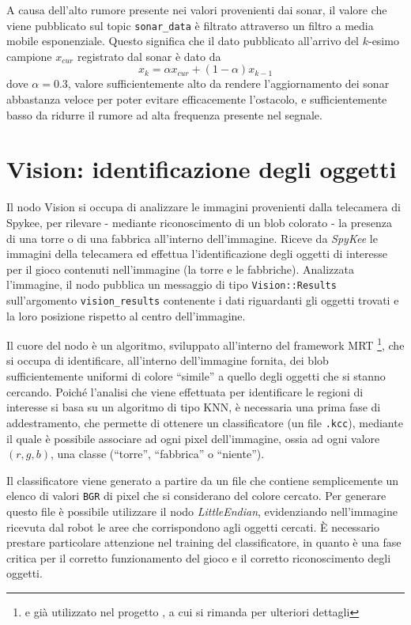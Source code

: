 A causa dell'alto rumore presente nei valori provenienti dai sonar, il valore che viene pubblicato sul topic \verb|sonar_data| è filtrato attraverso un filtro a media mobile esponenziale. Questo significa che il dato pubblicato all'arrivo del $k$-esimo campione $x_{cur}$ registrato dal sonar è dato da %
  \[ x_k = \alpha x_{cur} + (1 - \alpha) x_{k-1} \]
dove $\alpha = 0.3$, valore sufficientemente alto da rendere l'aggiornamento dei sonar abbastanza veloce per poter evitare efficacemente l'ostacolo, e sufficientemente basso da ridurre il rumore ad alta frequenza presente nel segnale.

\section{Vision: identificazione degli oggetti}

Il nodo Vision si occupa di analizzare le immagini provenienti dalla telecamera di Spykee, per rilevare - mediante riconoscimento di un blob colorato - la presenza di una torre o di una fabbrica all'interno dell'immagine. Riceve da \emph{SpyKee} le immagini della telecamera ed effettua l'identificazione degli oggetti di interesse per il gioco contenuti nell'immagine (la torre e le fabbriche). Analizzata l'immagine, il nodo pubblica un messaggio di tipo \verb|Vision::Results| sull'argomento \verb|vision_results| contenente i dati riguardanti gli oggetti trovati e la loro posizione rispetto al centro dell'immagine. %

Il cuore del nodo è un algoritmo, sviluppato all'interno del framework MRT \cite{mrt}\footnote{e già utilizzato nel progetto \cite{docmandelli}, a cui si rimanda per ulteriori dettagli}, che si occupa di identificare, all'interno dell'immagine fornita, dei blob sufficientemente uniformi di colore ``simile'' a quello degli oggetti che si stanno cercando. Poiché l'analisi che viene effettuata per identificare le regioni di interesse si basa su un algoritmo di tipo KNN, è necessaria una prima fase di addestramento, che permette di ottenere un classificatore (un file \verb|.kcc|), mediante il quale è possibile associare ad ogni pixel dell'immagine, ossia ad ogni valore $(r,g,b)$, una classe (``torre'', ``fabbrica'' o ``niente'').

Il classificatore viene generato a partire da un file che contiene semplicemente un elenco di valori \verb|BGR| di pixel che si considerano del colore cercato. Per generare questo file è possibile utilizzare il nodo \emph{LittleEndian}, evidenziando nell'immagine ricevuta dal robot le aree che corrispondono agli oggetti cercati. È necessario prestare particolare attenzione nel training del classificatore, in quanto è una fase critica per il corretto funzionamento del gioco e il corretto riconoscimento degli oggetti. %

